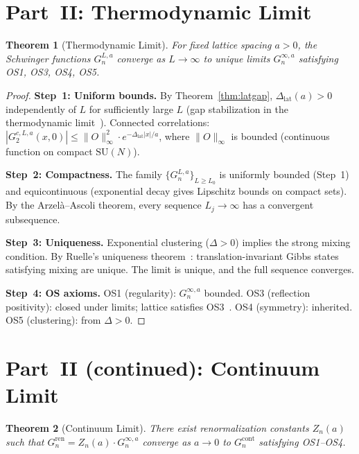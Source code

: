 \documentclass[12pt,a4paper]{article}
\theoremstyle{plain}
\newtheorem{theorem}{Theorem}[section]
\theoremstyle{definition}
\theoremstyle{remark}
\begin{document}
\section{Part~II: Thermodynamic Limit}\label{sec:thermo}

\begin{theorem}[Thermodynamic Limit]\label{thm:thermo}
For fixed lattice spacing $a>0$, the Schwinger functions $G_n^{L,a}$ converge as $L\to\infty$ to unique limits $G_n^{\infty,a}$ satisfying OS1, OS3, OS4, OS5.
\end{theorem}

\begin{proof}
\textbf{Step~1: Uniform bounds.} By Theorem~\ref{thm:latgap}, $\Delta_{\mathrm{lat}}(a)>0$ independently of $L$ for sufficiently large $L$ (gap stabilization in the thermodynamic limit~\cite{Ruelle1969}). Connected correlations:
$|G_2^{c,L,a}(x,0)| \leq \|O\|_\infty^2\cdot e^{-\Delta_{\mathrm{lat}}|x|/a}$,
where $\|O\|_\infty$ is bounded (continuous function on compact $\mathrm{SU}(N)$).

\textbf{Step~2: Compactness.} The family $\{G_n^{L,a}\}_{L\geq L_0}$ is uniformly bounded (Step~1) and equicontinuous (exponential decay gives Lipschitz bounds on compact sets). By the Arzel\`a--Ascoli theorem, every sequence $L_j\to\infty$ has a convergent subsequence.

\textbf{Step~3: Uniqueness.} Exponential clustering ($\Delta>0$) implies the strong mixing condition. By Ruelle's uniqueness theorem~\cite{Ruelle1969}: translation-invariant Gibbs states satisfying mixing are unique. The limit is unique, and the full sequence converges.

\textbf{Step~4: OS axioms.} OS1 (regularity): $G_n^{\infty,a}$ bounded. OS3 (reflection positivity): closed under limits; lattice satisfies OS3~\cite{OsterwalderSeiler1978}. OS4 (symmetry): inherited. OS5 (clustering): from $\Delta>0$.
\end{proof}

\section{Part~II (continued): Continuum Limit}\label{sec:contlim}

\begin{theorem}[Continuum Limit]\label{thm:cont}
There exist renormalization constants $Z_n(a)$ such that $G_n^{\mathrm{ren}}=Z_n(a)\cdot G_n^{\infty,a}$ converge as $a\to 0$ to $G_n^{\mathrm{cont}}$ satisfying OS1--OS4.
\end{theorem}
\end{document}

